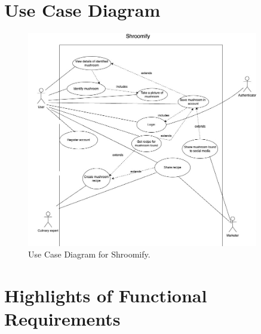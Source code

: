 \documentclass{article}
\begin{document}
\section{Use Case Diagram}
\label{sec:use_case_diagram}
\begin{figure}[H]
    \centering
    \includegraphics[width=0.9\textwidth]{3A04UseCaseDiagram.jpg}
    \caption{Use Case Diagram for Shroomify.}
    \label{fig:example}
\end{figure}

%
%
%

\section{Highlights of Functional Requirements}
\label{sec:functional_requirements}

\end{document}
